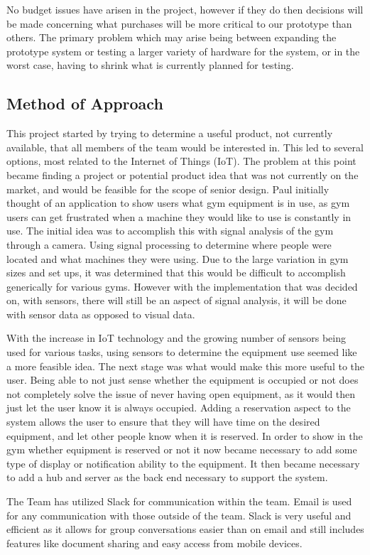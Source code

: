 \documentclass[PPFS.tex]{template/subfiles}
\begin{document}
    No budget issues have arisen in the project, however if they do then decisions will be made concerning what purchases will be more critical to our prototype than others. The primary problem which may arise being between expanding the prototype system or testing a larger variety of hardware for the system, or in the worst case, having to shrink what is currently planned for testing.  
	
	\subsection{Method of Approach}
	This project started by trying to determine a useful product, not currently available, that all members of the team would be interested in. This led to several options, most related to the Internet of Things (IoT). The problem at this point became finding a project or potential product idea that was not currently on the market, and would be feasible for the scope of senior design. Paul initially thought of an application to show users what gym equipment is in use, as gym users can get frustrated when a machine they would like to use is constantly in use. The initial idea was to accomplish this with signal analysis of the gym through a camera. Using signal processing to determine where people were located and what machines they were using. Due to the large variation in gym sizes and set ups, it was determined that this would be difficult to accomplish generically for various gyms. However with the implementation that was decided on, with sensors, there will still be an aspect of signal analysis, it will be done with sensor data as opposed to visual data.  
	
	With the increase in IoT technology and the growing number of sensors being used for various tasks, using sensors to determine the equipment use seemed like a more feasible idea. The next stage was what would make this more useful to the user. Being able to not just sense whether the equipment is occupied or not does not completely solve the issue of never having open equipment, as it would then just let the user know it is always occupied. Adding a reservation aspect to the system allows the user to ensure that they will have time on the desired equipment, and let other people know when it is reserved. In order to show in the gym whether equipment is reserved or not it now became necessary to add some type of display or notification ability to the equipment. It then became necessary to add a hub and server as the back end necessary to support the system.
	
	The Team has utilized Slack for communication within the team. Email is used for any communication with those outside of the team. Slack is very useful and efficient as it allows for group conversations easier than on email and still includes features like document sharing and easy access from mobile devices. 
	
\end{document}
